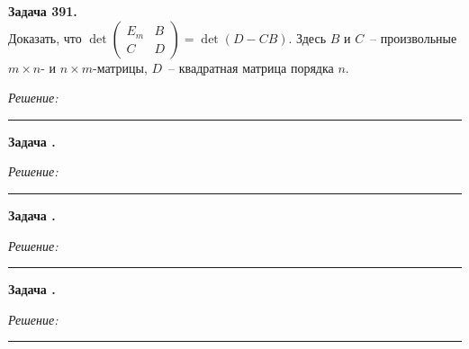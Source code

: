 \documentclass[a4paper, 12pt]{article}
\newenvironment{problem}[2][Задача]
    { \begin{mdframed}[backgroundcolor=gray!10] \textbf{#1 #2.} \\}
    {  \end{mdframed}}
\newenvironment{solution}
    {\textit{Решение: }}
    {\noindent\rule{7in}{1.5pt}}
\begin{document}
\begin{problem}{391}
Доказать, что $\det\left(\begin{array}{cc}E_m & B\\C & D\end{array}\right)=\det(D-CB)$.
Здесь $B$ и $C$~-- произвольные $m\times n$- и $n\times m$-матрицы, $D$~-- квадратная матрица порядка $n$.
\end{problem}
\begin{solution}



\end{solution} 

\begin{problem}{ }


\end{problem}
\begin{solution}



\end{solution} 

\begin{problem}{ }


\end{problem}
\begin{solution}



\end{solution} 

\begin{problem}{ }


\end{problem}
\begin{solution}



\end{solution} 
\end{document}
